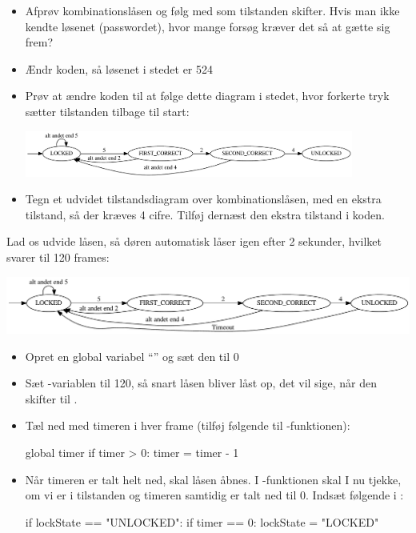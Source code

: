 \documentclass{ucph-handout}
\begin{document}
\begin{exercisebox}
\begin{itemize}
\item  Afprøv kombinationslåsen og følg med som tilstanden skifter. Hvis man
ikke kendte løsenet (passwordet), hvor mange forsøg kræver det så
at gætte sig frem?

\item Ændr koden, så løsenet i stedet er 524
\item Prøv at ændre koden til at følge dette diagram i stedet, hvor
  forkerte tryk sætter tilstanden tilbage til start:
  
\includegraphics[width=0.85\textwidth]{../illustrations/graphviz/combinationLock_resetting}

\item Tegn et udvidet tilstandsdiagram over kombinationslåsen, med en ekstra
  tilstand, så der kræves 4 cifre. Tilføj dernæst den ekstra tilstand i koden.
\end{itemize}
\end{exercisebox}
\begin{exercisebox}[adjusted title=Automatisk genlås efter 2 sekunder]
Lad os udvide låsen, så døren automatisk låser igen efter 2 sekunder,
hvilket svarer til 120 frames:

\noindent
\begin{center}
\includegraphics[width=1.0\textwidth]{../illustrations/graphviz/combinationLock_timeout}
\end{center}

\begin{itemize}
\item Opret en global variabel ``'' og sæt den til 0
\item Sæt -variablen til 120, så snart låsen bliver låst op, det vil
  sige, når den skifter  til .
\item Tæl ned med timeren i hver frame (tilføj følgende til -funktionen):
\begin{python}
global timer
if timer > 0:
    timer = timer - 1
\end{python}
\item Når timeren er talt helt ned, skal låsen åbnes. I
  -funktionen skal I nu tjekke, om vi er i tilstanden
   og timeren samtidig er talt ned til 0. Indsæt
  følgende i :
\begin{python}
if lockState == "UNLOCKED":
    if timer == 0:
        lockState = "LOCKED"
\end{python}
\end{itemize}
\end{exercisebox}
\end{document}

